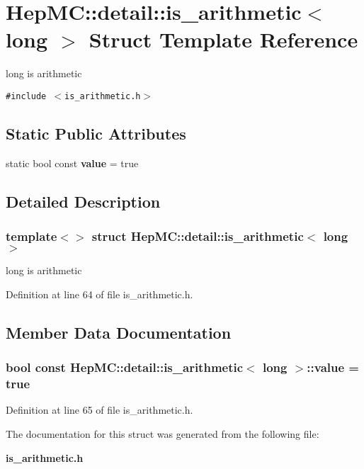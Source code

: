 \section{Hep\-MC::detail::is\_\-arithmetic$<$ long $>$ Struct Template Reference}
\label{structHepMC_1_1detail_1_1is__arithmetic_3_01long_01_4}
long is arithmetic  


{\tt \#include $<$is\_\-arithmetic.h$>$}

\subsection*{Static Public Attributes}
\begin{CompactItemize}
\item 
static bool const {\bf value} = true
\end{CompactItemize}


\subsection{Detailed Description}
\subsubsection*{template$<$$>$ struct Hep\-MC::detail::is\_\-arithmetic$<$ long $>$}

long is arithmetic 



Definition at line 64 of file is\_\-arithmetic.h.

\subsection{Member Data Documentation}
\subsubsection{\setlength{\rightskip}{0pt plus 5cm}bool const {\bf Hep\-MC::detail::is\_\-arithmetic}$<$ long $>$::{\bf value} = true\hspace{0.3cm}{\tt  [static]}}\label{structHepMC_1_1detail_1_1is__arithmetic_3_01long_01_4_e0d773a0ff3d52d407b8306f0e1c67f0}




Definition at line 65 of file is\_\-arithmetic.h.

The documentation for this struct was generated from the following file:\begin{CompactItemize}
\item 
{\bf is\_\-arithmetic.h}\end{CompactItemize}
